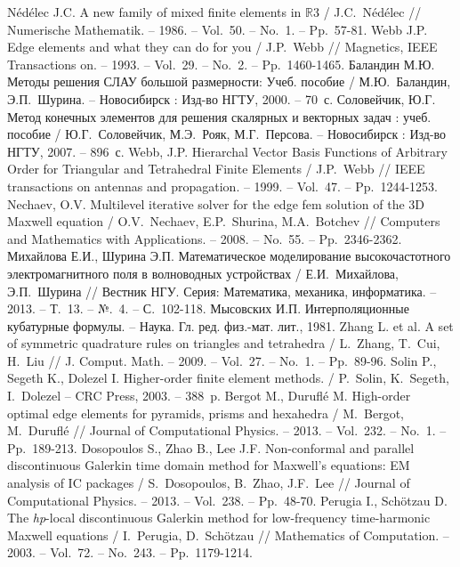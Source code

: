 \documentclass[a4paper,12pt]{article}
\begin{document}
\begin{thebibliography}{10}
Nédélec J.C. A new family of mixed finite elements in $\mathbb{R}$3 / J.C.~Nédélec // Numerische Mathematik. -- 1986. -- Vol.~50. -- No.~1. -- Pp.~57-81.
Webb J.P. Edge elements and what they can do for you / J.P.~Webb // Magnetics, IEEE Transactions on. -- 1993. -- Vol.~29. -- No.~2. -- Pp.~1460-1465.
Баландин М.Ю. Методы решения СЛАУ большой размерности: Учеб. пособие / М.Ю.~Баландин, Э.П.~Шурина. -- Новосибирск : Изд-во НГТУ, 2000. -- 70~с.
Соловейчик, Ю.Г. Метод конечных элементов для решения скалярных и векторных задач : учеб. пособие / Ю.Г.~Соловейчик, М.Э.~Рояк, М.Г.~Персова. -- Новосибирск : Изд-во НГТУ, 2007. -- 896~с.
Webb, J.P. Hierarchal Vector Basis Functions of Arbitrary Order for Triangular and Tetrahedral Finite Elements / J.P.~Webb // IEEE transactions on antennas and propagation. -- 1999. -- Vol.~47. -- Pp.~1244-1253.
Nechaev, O.V. Multilevel iterative solver for the edge fem solution of the 3D Maxwell equation / O.V.~Nechaev, E.P.~Shurina, M.A.~Botchev // Computers and Mathematics with Applications. -- 2008. -- No.~55. -- Pp.~2346-2362.
Михайлова Е.И., Шурина Э.П. Математическое моделирование высокочастотного электромагнитного поля в волноводных устройствах / Е.И.~Михайлова, Э.П.~Шурина // Вестник НГУ. Серия: Математика, механика, информатика. -- 2013. -- Т.~13. -- №.~4. -- С.~102-118.
Мысовских И.П. Интерполяционные кубатурные формулы. -- Наука. Гл. ред. физ.-мат. лит., 1981.
Zhang L. et al. A set of symmetric quadrature rules on triangles and tetrahedra / L.~Zhang, T.~Cui, H.~Liu // J. Comput. Math. -- 2009. -- Vol.~27. -- No.~1. -- Pp.~89-96.
Solin P., Segeth K., Dolezel I. Higher-order finite element methods. / P.~Solin, K.~Segeth, I.~Dolezel -- CRC Press, 2003. -- 388~p.
Bergot M., Duruflé M. High-order optimal edge elements for pyramids, prisms and hexahedra / M.~Bergot, M.~Duruflé // Journal of Computational Physics. -- 2013. -- Vol.~232. -- No.~1. -- Pp.~189-213.
Dosopoulos S., Zhao B., Lee J.F. Non-conformal and parallel discontinuous Galerkin time domain method for Maxwell’s equations: EM analysis of IC packages / S.~Dosopoulos, B.~Zhao, J.F.~Lee // Journal of Computational Physics. -- 2013. -- Vol.~238. -- Pp.~48-70.
Perugia I., Schötzau D. The \textit{hp}-local discontinuous Galerkin method for low-frequency time-harmonic Maxwell equations / I.~Perugia, D.~Schötzau // Mathematics of Computation. -- 2003. -- Vol.~72. -- No.~243. -- Pp.~1179-1214.

\end{thebibliography}
\end{document}
